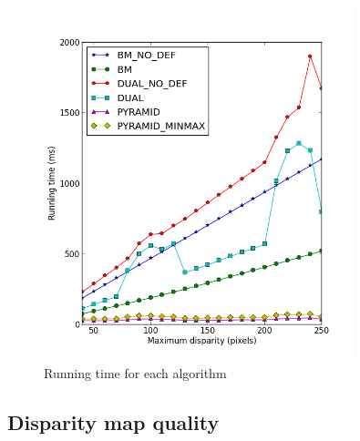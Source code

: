\begin{figure}
  \centering
  \includegraphics[width=0.8\textwidth]{images/runtime_9.png}
  \caption{Running time for each algorithm}
  \label{runtime-9}
\end{figure}

\subsection{Disparity map quality}


